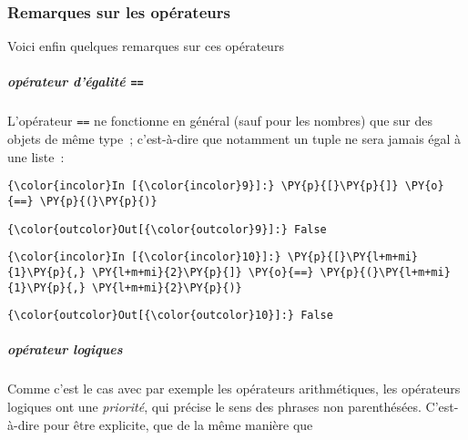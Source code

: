     \hypertarget{remarques-sur-les-opuxe9rateurs}{%
\subsubsection{Remarques sur les
opérateurs}\label{remarques-sur-les-opuxe9rateurs}}

    Voici enfin quelques remarques sur ces opérateurs

    \hypertarget{opuxe9rateur-duxe9galituxe9}{%
\subparagraph{\texorpdfstring{opérateur d'égalité
\texttt{==}}{opérateur d'égalité ==}}\label{opuxe9rateur-duxe9galituxe9}}

    L'opérateur \texttt{==} ne fonctionne en général (sauf pour les nombres)
que sur des objets de même type~; c'est-à-dire que notamment un tuple ne
sera jamais égal à une liste~:

    \begin{Verbatim}[commandchars=\\\{\},frame=single,framerule=0.3mm,rulecolor=\color{cellframecolor}]
{\color{incolor}In [{\color{incolor}9}]:} \PY{p}{[}\PY{p}{]} \PY{o}{==} \PY{p}{(}\PY{p}{)}
\end{Verbatim}


\begin{Verbatim}[commandchars=\\\{\},frame=single,framerule=0.3mm,rulecolor=\color{cellframecolor}]
{\color{outcolor}Out[{\color{outcolor}9}]:} False
\end{Verbatim}
            
    \begin{Verbatim}[commandchars=\\\{\},frame=single,framerule=0.3mm,rulecolor=\color{cellframecolor}]
{\color{incolor}In [{\color{incolor}10}]:} \PY{p}{[}\PY{l+m+mi}{1}\PY{p}{,} \PY{l+m+mi}{2}\PY{p}{]} \PY{o}{==} \PY{p}{(}\PY{l+m+mi}{1}\PY{p}{,} \PY{l+m+mi}{2}\PY{p}{)}
\end{Verbatim}


\begin{Verbatim}[commandchars=\\\{\},frame=single,framerule=0.3mm,rulecolor=\color{cellframecolor}]
{\color{outcolor}Out[{\color{outcolor}10}]:} False
\end{Verbatim}
            
    \hypertarget{opuxe9rateur-logiques}{%
\subparagraph{opérateur logiques}\label{opuxe9rateur-logiques}}

    Comme c'est le cas avec par exemple les opérateurs arithmétiques, les
opérateurs logiques ont une \emph{priorité}, qui précise le sens des
phrases non parenthésées. C'est-à-dire pour être explicite, que de la
même manière que

